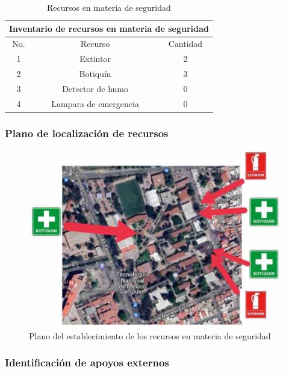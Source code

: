     \begin{table}[H]
        \centering
        \caption{Recursos en materia de seguridad}
        \begin{tabular}{c c c}
        \hline
        \multicolumn{3}{c}{Inventario de recursos en materia de seguridad}\\
        \hline
             No.& Recurso & Cantidad  \\
        \hline
             1& Extintor & 2  \\
        \hline
             2& Botiquín & 3  \\
        \hline
             3& Detector de humo & 0 \\
        \hline
             4& Lampara de emergencia & 0 \\
        \hline     
        \end{tabular}
        \label{tab:inventario}
    \end{table}
    \subsubsection{Plano de localización de recursos}
    \begin{figure}[H]
        \centering
        \includegraphics[trim = {1mm 1mm 1mm 1mm},clip,scale=0.3]{8/Img/Plano de los recursos en materia de seguridad.pdf}
        \caption{Plano del establecimiento de los recursos en materia de seguridad}
        \label{Plano de los recursos en materia de seguridad}
    \end{figure}
    \subsubsection{ Identificación de apoyos externos}
    
